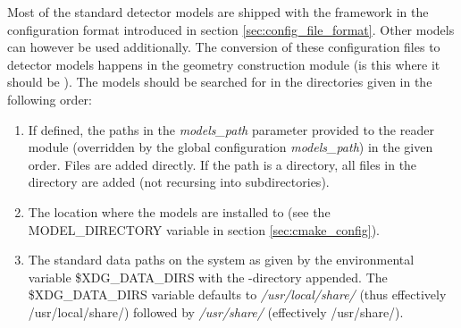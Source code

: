 Most of the standard detector models are shipped with the framework in the configuration format introduced in section \ref{sec:config_file_format}. Other models can however be used additionally. The conversion of these configuration files to detector models happens in the geometry construction module (\todo is this where it should be \todo). The models should be searched for in the directories given in the following order:
\begin{enumerate}
\item If defined, the paths in the \textit{models\_path} parameter provided to the reader module (overridden by the global configuration \textit{models\_path}) in the given order. Files are added directly. If the path is a directory, all files in the directory are added (not recursing into subdirectories).
\item The location where the models are installed to (see the MODEL\_DIRECTORY variable in section \ref{sec:cmake_config}). 
\item The standard data paths on the system as given by the environmental variable \$XDG\_DATA\_DIRS with the \project-directory appended. The \$XDG\_DATA\_DIRS variable defaults to \textit{/usr/local/share/} (thus effectively /usr/local/share/\project) followed by \textit{/usr/share/} (effectively /usr/share/\project).
\end{enumerate}

